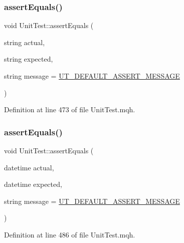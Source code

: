 \subsubsection{\texorpdfstring{assert\+Equals()}{assertEquals()}\hspace{0.1cm}{\footnotesize\ttfamily [12/28]}}
{\footnotesize\ttfamily void Unit\+Test\+::assert\+Equals (\begin{DoxyParamCaption}\item[{string}]{actual,  }\item[{string}]{expected,  }\item[{string}]{message = {\ttfamily \mbox{\hyperlink{_unit_test_8mqh_a96f5d62188d09039ebc3f443c9120e39}{U\+T\+\_\+\+D\+E\+F\+A\+U\+L\+T\+\_\+\+A\+S\+S\+E\+R\+T\+\_\+\+M\+E\+S\+S\+A\+GE}}} }\end{DoxyParamCaption})}



Definition at line 473 of file Unit\+Test.\+mqh.

\mbox{\label{class_unit_test_a21088b3d491f38b4636280bd9b0b6924}} 
\subsubsection{\texorpdfstring{assert\+Equals()}{assertEquals()}\hspace{0.1cm}{\footnotesize\ttfamily [13/28]}}
{\footnotesize\ttfamily void Unit\+Test\+::assert\+Equals (\begin{DoxyParamCaption}\item[{datetime}]{actual,  }\item[{datetime}]{expected,  }\item[{string}]{message = {\ttfamily \mbox{\hyperlink{_unit_test_8mqh_a96f5d62188d09039ebc3f443c9120e39}{U\+T\+\_\+\+D\+E\+F\+A\+U\+L\+T\+\_\+\+A\+S\+S\+E\+R\+T\+\_\+\+M\+E\+S\+S\+A\+GE}}} }\end{DoxyParamCaption})}



Definition at line 486 of file Unit\+Test.\+mqh.

\mbox{\label{class_unit_test_afacce638f6dc7feccafe3ba570d698f2}} 

